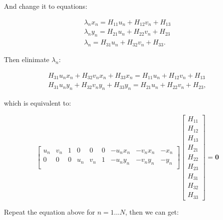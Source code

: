 \documentclass[11pt]{article}
\begin{document}
And change it to equations:

\begin{align}
    \lambda_n x_{n} = H_{11} u_{n} + H_{12} v_{n} + H_{13} \\
    \lambda_n y_{n} = H_{21} u_{n} + H_{22} v_{n} + H_{23} \\
    \lambda_n = H_{31} u_{n} + H_{32} v_{n} + H_{33} .
\end{align}

Then elinimate $\lambda_n$:

\begin{align}
    H_{31} u_{n} x_{n} + H_{32} v_{n} x_{n} + H_{33} x_{n} = H_{11} u_{n} + H_{12} v_{n} + H_{13} \\
    H_{31} u_{n} y_{n} + H_{32} v_{n} y_{n} + H_{33} y_{n} = H_{21} u_{n} + H_{22} v_{n} + H_{23},
\end{align}

which is equivalent to:

\begin{equation}
    \begin{bmatrix}
        u_{n} & v_{n} & 1 & 0 & 0 & 0 & -u_{n} x_{n} & -v_{n} x_{n} & -x_{n} \\
        0 & 0 & 0 & u_{n} & v_{n} & 1 & -u_{n} y_{n} & -v_{n} y_{n} & -y_{n} \\
    \end{bmatrix}
    \begin{bmatrix}
        H_{11} \\ H_{12} \\ H_{13} \\
        H_{21} \\ H_{22} \\ H_{23} \\
        H_{31} \\ H_{32} \\ H_{33}
    \end{bmatrix}
    = \mathbf{0}
\end{equation}

Repeat the equation above for $n=1...N$, then we can get:
\end{document}

